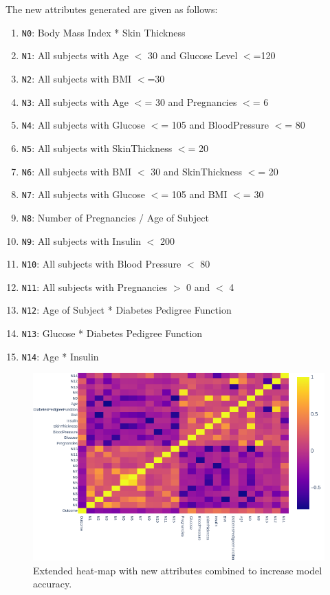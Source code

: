 \documentclass[12pt]{article}
\begin{document}
The new attributes generated are given as follows:

\begin{enumerate}

\item \texttt{N0}: Body Mass Index * Skin Thickness
\item \texttt{N1}: All subjects with Age $<$ 30 and Glucose Level $<$=120
\item \texttt{N2}: All subjects with BMI $<$=30
\item \texttt{N3}: All subjects with Age $<$= 30 and Pregnancies $<$= 6
\item \texttt{N4}: All subjects with Glucose $<$= 105 and BloodPressure $<$= 80
\item \texttt{N5}: All subjects with SkinThickness $<$= 20
\item \texttt{N6}: All subjects with BMI $<$ 30 and SkinThickness $<$= 20
\item \texttt{N7}: All subjects with Glucose $<$= 105 and BMI $<$= 30
\item \texttt{N8}: Number of Pregnancies / Age of Subject
\item \texttt{N9}: All subjects with Insulin $<$ 200
\item \texttt{N10}: All subjects with Blood Pressure $<$ 80
\item \texttt{N11}: All subjects with Pregnancies $>$ 0 and $<$ 4
\item \texttt{N12}: Age of Subject * Diabetes Pedigree Function
\item \texttt{N13}: Glucose * Diabetes Pedigree Function
\item \texttt{N14}: Age * Insulin

\end{enumerate} 

{
\clearpage
\begin{landscape}
\begin{figure}[ht]
\centering
\includegraphics[width=1.5\textwidth]{newplot(42).png}
\caption{\label{fig:49} Extended heat-map with new attributes combined to increase model accuracy.}
\end{figure}
\end{landscape}
}
\end{document}
